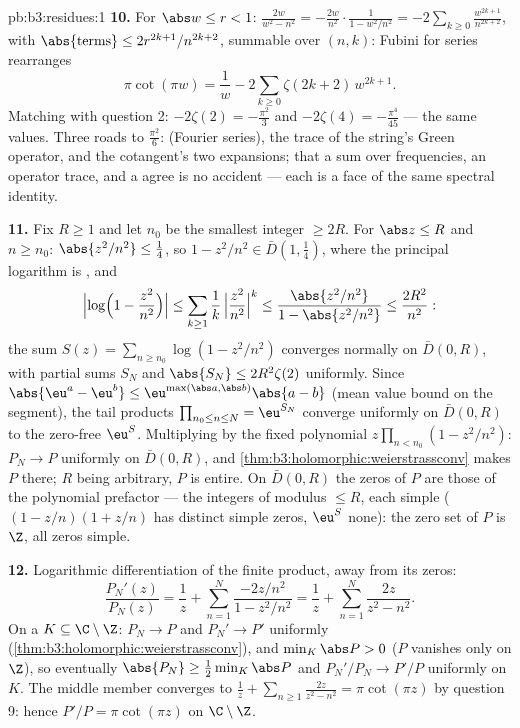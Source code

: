 \begin{solution}{pb:b3:residues:1}
\textbf{10.} For $\abs w \leq r < 1$: $\frac{2w}{w^2 - n^2} =
-\frac{2w}{n^2}\cdot\frac1{1 - w^2/n^2} =
-2\sum_{k\geq0}\frac{w^{2k+1}}{n^{2k+2}}$, with
$\abs{\text{terms}} \leq 2r^{2k+1}/n^{2k+2}$, summable over
$(n, k)$: Fubini for series rearranges
\[
\pi\cot(\pi w) = \frac1w -
2\sum_{k\geq0}\zeta(2k+2)\,w^{2k+1} .
\]
Matching with question 2: $-2\zeta(2) = -\frac{\pi^2}3$ and
$-2\zeta(4) = -\frac{\pi^4}{45}$ --- the same values. Three
roads to $\frac{\pi^2}6$:  (Fourier series), the
trace of the string's Green operator, and the cotangent's two
expansions; that a sum over frequencies, an operator trace,
and a  agree is no accident --- each is a
face of the same spectral identity.

\textbf{11.} Fix $R \geq 1$ and let $n_0$ be the smallest
integer $\geq 2R$. For $\abs z \leq R$ and $n \geq n_0$:
$\abs{z^2/n^2} \leq \frac14$, so $1 - z^2/n^2 \in
\bar D(1, \frac14)$, where the principal logarithm is
, and
\[
\Bigl|\log\Bigl(1 - \frac{z^2}{n^2}\Bigr)\Bigr|
\leq \sum_{k\geq1}\frac1k\,\Bigl|\frac{z^2}{n^2}\Bigr|^k
\leq \frac{\abs{z^2/n^2}}{1 - \abs{z^2/n^2}}
\leq \frac{2R^2}{n^2} :
\]
the sum $S(z) = \sum_{n\geq n_0}\log(1 - z^2/n^2)$ converges
normally on $\bar D(0, R)$, with  partial sums
$S_N$ and $\abs{S_N} \leq 2R^2\zeta(2)$ uniformly. Since
$\abs{\eu^a - \eu^b} \leq
\eu^{\max(\abs a,\abs b)}\abs{a - b}$ (mean value bound on
the segment), the tail products $\prod_{n_0\leq n\leq N} =
\eu^{S_N}$ converge uniformly on $\bar D(0, R)$ to the
zero-free $\eu^S$. Multiplying by the fixed polynomial
$z\prod_{n<n_0}(1 - z^2/n^2)$: $P_N \to P$ uniformly on
$\bar D(0, R)$, and
\cref{thm:b3:holomorphic:weierstrassconv} makes $P$
 there; $R$ being arbitrary, $P$ is entire. On
$\bar D(0, R)$ the zeros of $P$ are those of the polynomial
prefactor --- the integers of modulus $\leq R$, each simple
($(1 - z/n)(1 + z/n)$ has distinct simple zeros, $\eu^S$
none): the zero set of $P$ is $\Z$, all zeros simple.

\textbf{12.} Logarithmic differentiation of the finite
product, away from its zeros:
\[
\frac{P_N'(z)}{P_N(z)} = \frac1z +
\sum_{n=1}^{N}\frac{-2z/n^2}{1 - z^2/n^2}
= \frac1z + \sum_{n=1}^{N}\frac{2z}{z^2 - n^2} .
\]
On a  $K \subseteq \C\setminus\Z$: $P_N \to P$ and
$P_N' \to P'$ uniformly
(\cref{thm:b3:holomorphic:weierstrassconv}), and $\min_K
\abs P > 0$ ($P$ vanishes only on $\Z$), so eventually
$\abs{P_N} \geq \frac12\min_K\abs P$ and $P_N'/P_N \to
P'/P$ uniformly on $K$. The middle member converges to
$\frac1z + \sum_{n\geq1}\frac{2z}{z^2-n^2} = \pi\cot(\pi z)$
by question 9: hence $P'/P = \pi\cot(\pi z)$ on
$\C\setminus\Z$.


\end{solution}
